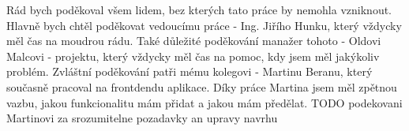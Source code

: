 Rád bych poděkoval všem lidem, bez kterých tato práce by nemohla vzniknout. Hlavně bych chtěl poděkovat vedoucímu práce - Ing. Jiřího Hunku, který vždycky měl čas na moudrou rádu. Také důležité poděkování manažer tohoto - Oldovi Malcovi - projektu, který vždycky měl čas na pomoc, kdy jsem měl jakýkoliv problém. Zvláštní poděkování patři mému kolegovi - Martinu Beranu, který současně pracoval na frontdendu aplikace. Díky práce Martina jsem měl zpětnou vazbu, jakou funkcionalitu mám přidat a jakou mám předělat. TODO podekovani Martinovi za srozumitelne pozadavky an upravy navrhu